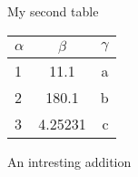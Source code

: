 \documentclass[first=firstname,last=lastname,company=comp,location=Dresden,simple]{baarticle}
\begin{document}
\begin{basimple}
        \lipsum[10]

        \begin{batable}{My second table}
            \begin{tabular}{l|c|r} %
                $\alpha$ & $\beta$ & $\gamma$ \\
                \hline
                1 & 11.1 & a\\
                2 & 180.1 & b\\
                3 & 4.25231 & c\\
            \end{tabular}
        \end{batable}

        \clearpage

        \begin{baappx}
            \begin{bafigure}{An intresting addition}
                \lipsum[4]
                \lipsum[4]
            \end{bafigure}
        \end{baappx}
    \end{basimple}
\end{document}
